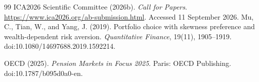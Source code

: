 \documentclass[11pt,a4paper]{article}
\numberwithin{equation}{section}
\numberwithin{table}{section}
\numberwithin{figure}{section}
\theoremstyle{plain}
\theoremstyle{definition}
\begin{document}
\begin{thebibliography}{99}
ICA2026 Scientific Committee (2026b).
\emph{Call for Papers}.
\url{https://www.ica2026.org/ab-submission.html}.
Accessed 11 September 2026.
Mu, C., Tian, W., and Yang, J. (2019).
Portfolio choice with skewness preference and wealth-dependent risk aversion.
\emph{Quantitative Finance}, 19(11), 1905--1919.
doi:10.1080/14697688.2019.1592214.


OECD (2025).
\emph{Pension Markets in Focus 2025}.
Paris: OECD Publishing.
doi:10.1787/b095d0a0-en.


\end{thebibliography}\endgroup
\end{document}
